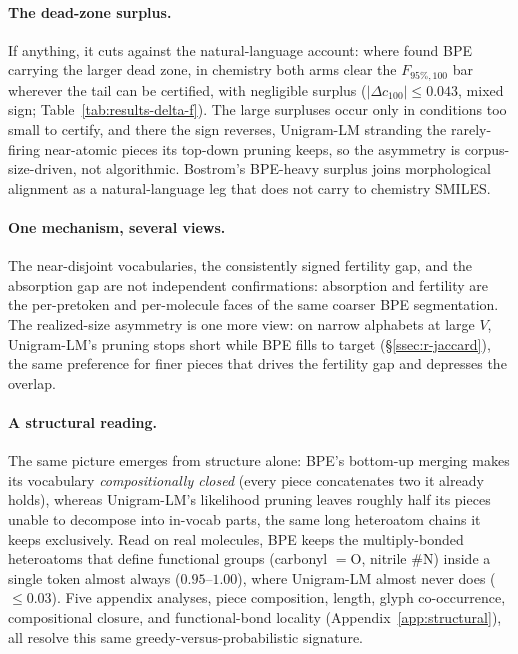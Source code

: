 \documentclass{article}
\begin{document}
\paragraph{The dead-zone surplus.}
If anything, it cuts against the natural-language account: where
\citet{bostrom2020bpe-suboptimal} found BPE carrying the larger dead zone, in
chemistry both arms clear the $F_{95\%,100}$ bar wherever the tail can be
certified, with negligible surplus ($|\Delta c_{100}| \le 0.043$, mixed sign;
Table~\ref{tab:results-delta-f}). The large surpluses occur only in conditions
too small to certify, and there the sign reverses, Unigram-LM stranding the
rarely-firing near-atomic pieces its top-down pruning keeps, so the asymmetry is
corpus-size-driven, not algorithmic. Bostrom's BPE-heavy surplus joins
morphological alignment as a natural-language leg that does not carry to
chemistry SMILES.

\paragraph{One mechanism, several views.}
The near-disjoint vocabularies, the consistently signed fertility gap, and the
absorption gap are not independent confirmations: absorption and fertility are
the per-pretoken and per-molecule faces of the same coarser BPE segmentation. The realized-size asymmetry is one
more view: on narrow alphabets at large $V$, Unigram-LM's pruning stops short
while BPE fills to target (\S\ref{ssec:r-jaccard}), the same preference for finer
pieces that drives the fertility gap and depresses the overlap.

\paragraph{A structural reading.}
The same picture emerges from structure alone: BPE's bottom-up merging makes its vocabulary
\emph{compositionally closed} (every piece concatenates two it already holds),
whereas Unigram-LM's likelihood pruning leaves roughly half its pieces unable to
decompose into in-vocab parts, the same long heteroatom chains
it keeps exclusively. Read on real molecules, BPE keeps the multiply-bonded
heteroatoms that define functional groups (carbonyl $=$O, nitrile $\#$N) inside a
single token almost always ($0.95$--$1.00$), where Unigram-LM almost never does
($\le 0.03$). Five appendix analyses, piece composition, length, glyph
co-occurrence, compositional closure, and functional-bond locality
(Appendix~\ref{app:structural}), all resolve this same
greedy-versus-probabilistic signature.
\end{document}
